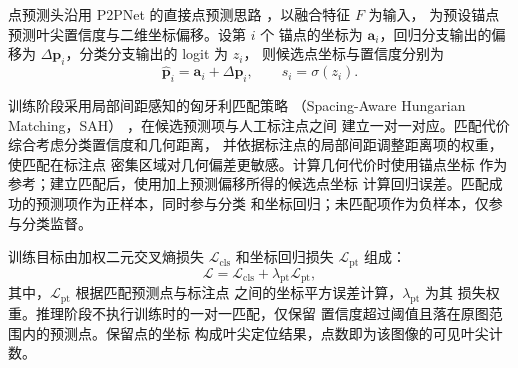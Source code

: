 点预测头沿用 P2PNet 的直接点预测思路
，以融合特征 \(F\) 为输入，
为预设锚点预测叶尖置信度与二维坐标偏移。设第 \(i\) 个
锚点的坐标为 \(\mathbf{a}_i\)，回归分支输出的偏移为
\(\Delta\mathbf{p}_i\)，分类分支输出的 logit 为 \(z_i\)，
则候选点坐标与置信度分别为
\begin{equation}
  \widehat{\mathbf{p}}_i
    =\mathbf{a}_i+\Delta\mathbf{p}_i,\qquad
  s_i=\sigma(z_i).
  \label{eq:cgtipnet-point-prediction}
\end{equation}

训练阶段采用局部间距感知的匈牙利匹配策略
（Spacing-Aware Hungarian Matching，SAH）
，在候选预测项与人工标注点之间
建立一对一对应。匹配代价综合考虑分类置信度和几何距离，
并依据标注点的局部间距调整距离项的权重，使匹配在标注点
密集区域对几何偏差更敏感。计算几何代价时使用锚点坐标
作为参考；建立匹配后，使用加上预测偏移所得的候选点坐标
计算回归误差。匹配成功的预测项作为正样本，同时参与分类
和坐标回归；未匹配项作为负样本，仅参与分类监督。

训练目标由加权二元交叉熵损失 \(\mathcal{L}_{\mathrm{cls}}\)
和坐标回归损失 \(\mathcal{L}_{\mathrm{pt}}\) 组成：
\begin{equation}
  \mathcal{L}
  = \mathcal{L}_{\mathrm{cls}}
  + \lambda_{\mathrm{pt}}\mathcal{L}_{\mathrm{pt}},
  \label{eq:cgtipnet-loss}
\end{equation}
其中，\(\mathcal{L}_{\mathrm{pt}}\) 根据匹配预测点与标注点
之间的坐标平方误差计算，\(\lambda_{\mathrm{pt}}\) 为其
损失权重。推理阶段不执行训练时的一对一匹配，仅保留
置信度超过阈值且落在原图范围内的预测点。保留点的坐标
构成叶尖定位结果，点数即为该图像的可见叶尖计数。